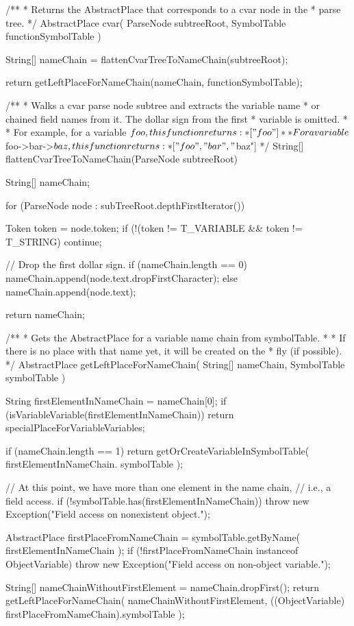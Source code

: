 \begin{textcode}
/**
 * Returns the AbstractPlace that corresponds to a cvar node in the
 * parse tree.
 */
AbstractPlace cvar(
  ParseNode subtreeRoot, SymbolTable functionSymbolTable
) {
  String[] nameChain = flattenCvarTreeToNameChain(subtreeRoot);

  return getLeftPlaceForNameChain(nameChain, functionSymbolTable);
}
\end{textcode}

\begin{textcode}
/**
 * Walks a cvar parse node subtree and extracts the variable name
 * or chained field names from it. The dollar sign from the first
 * variable is omitted.
 *
 * For example, for a variable $foo, this function returns:
 * ["foo"]
 *
 * For a variable $foo->bar->$baz, this function returns:
 * ["foo", "bar", "$baz"]
 */
String[] flattenCvarTreeToNameChain(ParseNode subtreeRoot) {
  String[] nameChain;

  for (ParseNode node : subTreeRoot.depthFirstIterator()) {
    Token token = node.token;
    if (!(token != T_VARIABLE && token != T_STRING) {
      continue;
    }

    // Drop the first dollar sign.
    if (nameChain.length == 0) {
      nameChain.append(node.text.dropFirstCharacter);
    } else {
      nameChain.append(node.text);
    }
  }

  return nameChain;
}
\end{textcode}

\begin{textcode}
/**
 * Gets the AbstractPlace for a variable name chain from symbolTable.
 *
 * If there is no place with that name yet, it will be created on the
 * fly (if possible).
 */
AbstractPlace getLeftPlaceForNameChain(
  String[] nameChain, SymbolTable symbolTable
) {
  String firstElementInNameChain = nameChain[0];
  if (isVariableVariable(firstElementInNameChain)) {
    return specialPlaceForVariableVariables;
  }

  if (nameChain.length == 1) {
    return getOrCreateVariableInSymbolTable(
      firstElementInNameChain. symbolTable
    );
  }

  // At this point, we have more than one element in the name chain,
  // i.e., a field access.
  if (!symbolTable.has(firstElementInNameChain)) {
    throw new Exception("Field access on nonexistent object.");
  }

  AbstractPlace firstPlaceFromNameChain = symbolTable.getByName(
    firstElementInNameChain
  );
  if (!firstPlaceFromNameChain instanceof ObjectVariable) {
    throw new Exception("Field access on non-object variable.");
  }

  String[] nameChainWithoutFirstElement = nameChain.dropFirst();
  return getLeftPlaceForNameChain(
    nameChainWithoutFirstElement,
    ((ObjectVariable) firstPlaceFromNameChain).symbolTable
  );
}
\end{textcode}


